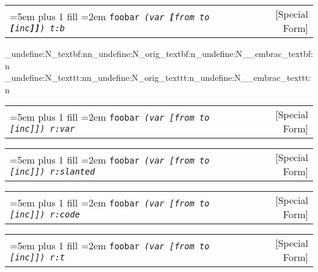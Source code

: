 \documentclass{book}
\newcommand\GNUTexinfocommandstyletextvar[1]{{\normalfont{}\textsl{#1}}}%
\begin{document}
%

%
%
\noindent\begin{tabularx}{\linewidth}{@{}Xr}
\rightskip=5em plus 1 fill
\hangindent=2em
\noindent\texttt{foobar \EmbracOn{}\textnormal{\textsl{(var \texttt{\textbf{[}}from to \texttt{\textbf{[}}inc\texttt{\textbf{]]}}) t:b}}\EmbracOff{}}& [Special Form]
\end{tabularx}
\ExplSyntaxOn%
\cs_undefine:N{\embrac_textbf:nn}\cs_undefine:N{\embrac_orig_textbf:n}\cs_undefine:N{\__embrac_textbf:n}%
\cs_undefine:N{\embrac_texttt:nn}\cs_undefine:N{\embrac_orig_texttt:n}\cs_undefine:N{\__embrac_texttt:n}%
\ExplSyntaxOff%

%

\noindent\begin{tabularx}{\linewidth}{@{}Xr}
\rightskip=5em plus 1 fill
\hangindent=2em
\noindent\texttt{foobar \EmbracOn{}\textnormal{\textsl{(var \EmbracOff{}\textnormal{\GNUTexinfocommandstyletextvar{[}}\EmbracOn{}from to \EmbracOff{}\textnormal{\GNUTexinfocommandstyletextvar{[}}\EmbracOn{}inc\EmbracOff{}\textnormal{\GNUTexinfocommandstyletextvar{]]}}\EmbracOn{}) r:var}}\EmbracOff{}}& [Special Form]
\end{tabularx}

%

\noindent\begin{tabularx}{\linewidth}{@{}Xr}
\rightskip=5em plus 1 fill
\hangindent=2em
\noindent\texttt{foobar \EmbracOn{}\textnormal{\textsl{(var \EmbracOff{}\textnormal{\textsl{[}}\EmbracOn{}from to \EmbracOff{}\textnormal{\textsl{[}}\EmbracOn{}inc\EmbracOff{}\textnormal{\textsl{]]}}\EmbracOn{}) r:slanted}}\EmbracOff{}}& [Special Form]
\end{tabularx}

%

\noindent\begin{tabularx}{\linewidth}{@{}Xr}
\rightskip=5em plus 1 fill
\hangindent=2em
\noindent\texttt{foobar \EmbracOn{}\textnormal{\textsl{(var \EmbracOff{}\textnormal{\texttt{[}}\EmbracOn{}from to \EmbracOff{}\textnormal{\texttt{[}}\EmbracOn{}inc\EmbracOff{}\textnormal{\texttt{]]}}\EmbracOn{}) r:code}}\EmbracOff{}}& [Special Form]
\end{tabularx}

%

\noindent\begin{tabularx}{\linewidth}{@{}Xr}
\rightskip=5em plus 1 fill
\hangindent=2em
\noindent\texttt{foobar \EmbracOn{}\textnormal{\textsl{(var \EmbracOff{}\textnormal{\texttt{[}}\EmbracOn{}from to \EmbracOff{}\textnormal{\texttt{[}}\EmbracOn{}inc\EmbracOff{}\textnormal{\texttt{]]}}\EmbracOn{}) r:t}}\EmbracOff{}}& [Special Form]
\end{tabularx}
\end{document}
